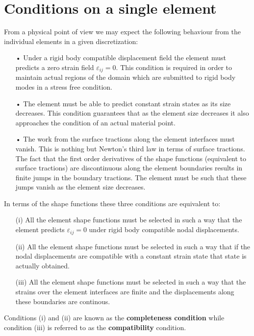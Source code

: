 \section{Conditions on a single element}
From a physical point of view we may expect the following behaviour from the individual elements in a given discretization:

\begin{itemize}
\item[•] Under a rigid body compatible displacement field the element must 
predicts a zero strain field ${\varepsilon _{ij}} = 0.$ This condition is 
required in order to maintain actual regions of the domain which are submitted 
to rigid body modes in a stress free condition.

\item[•] The element must be able to predict constant strain states as its size 
decreases. This condition guarantees that as the element size decreases it also 
approaches the condition of an actual material point.

\item[•] The work from the surface tractions along the element interfaces must 
vanish. This is nothing but Newton's third law in terms of surface tractions. 
The fact that the first order derivatives of the shape functions (equivalent to 
surface tractions) are discontinuous along the element boundaries results in 
finite jumps in the boundary tractions. The element must be such that these 
jumps vanish as the element size decreases.   
\end{itemize}

In terms of the shape functions these three conditions are equivalent to:


\begin{itemize}
\item[(i)] All the element shape functions must be selected in such a way that the element predicts ${\varepsilon _{ij}} = 0$ under rigid body compatible nodal displacements.
\item[(ii)] All the element shape functions must be selected in such a way that if the nodal displacements are compatible with a constant strain state that state is actually obtained.
\item[(iii)] All the element shape functions must be selected in such a way that the strains over the element interfaces are finite and the displacements along these boundaries are continous. 
\end{itemize}

Conditions (i) and (ii) are known as the {\bf completeness condition} while condition (iii) is referred to as the {\bf compatibility} condition.



